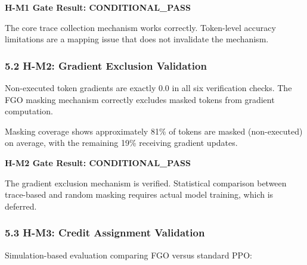 \textbf{H-M1 Gate Result: CONDITIONAL\_PASS}

The core trace collection mechanism works correctly. Token-level accuracy limitations are a mapping issue that does not invalidate the mechanism.

\subsubsection{5.2 H-M2: Gradient Exclusion Validation}

\begin{table}[htbp]
\centering
{}
\end{table}

Non-executed token gradients are exactly 0.0 in all six verification checks. The FGO masking mechanism correctly excludes masked tokens from gradient computation.

Masking coverage shows approximately 81\% of tokens are masked (non-executed) on average, with the remaining 19\% receiving gradient updates.

\textbf{H-M2 Gate Result: CONDITIONAL\_PASS}

The gradient exclusion mechanism is verified. Statistical comparison between trace-based and random masking requires actual model training, which is deferred.

\subsubsection{5.3 H-M3: Credit Assignment Validation}

Simulation-based evaluation comparing FGO versus standard PPO:

\begin{table}[htbp]
\centering
{}
\end{table}

